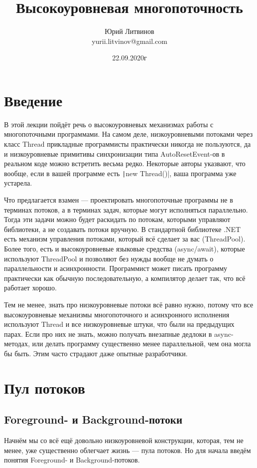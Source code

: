 \documentclass[a5paper]{article}
\title{Высокоуровневая многопоточность}
\author{Юрий Литвинов\\\small{yurii.litvinov@gmail.com}}
\date{22.09.2020г}
\begin{document}
\maketitle
\thispagestyle{empty}

\section{Введение}

В этой лекции пойдёт речь о высокоуровневых механизмах работы с многопоточными программами. На самом деле, низкоуровневыми потоками через класс Thread прикладные программисты практически никогда не пользуются, да и низкоуровневые примитивы синхронизации типа AutoResetEvent-ов в реальном коде можно встретить весьма редко. Некоторые авторы указвают, что вообще, если в вашей программе есть \texttt|new Thread()|, ваша программа уже устарела.

Что предлагается взамен --- проектировать многопоточные программы не в терминах потоков, а в терминах задач, которые могут исполняться параллельно. Тогда эти задачи можно будет раскидать по потокам, которыми управляют библиотеки, а не создавать потоки вручную. В стандартной библиотеке .NET есть механизм управления потоками, который всё сделает за вас (ThreadPool). Более того, есть и высокоуровневые языковые средства (async/await), которые используют ThreadPool и позволяют без нужды вообще не думать о параллельности и асинхронности. Программист может писать программу практически как обычную последовательную, а компилятор делает так, что всё работает хорошо.

Тем не менее, знать про низкоуровневые потоки всё равно нужно, потому что все высокоуровневые механизмы многопоточного и асинхронного исполнения используют Thread и все низкоуровневые штуки, что были на предыдущих парах. Если про них не знать, можно получать внезапные дедлоки в async-методах, или делать программу существенно менее параллельной, чем она могла бы быть. Этим часто страдают даже опытные разработчики.

\section{Пул потоков}

\subsection{Foreground- и Background-потоки}

Начнём мы со всё ещё довольно низкоуровневой конструкции, которая, тем не менее, уже существенно облегчает жизнь --- пула потоков. Но для начала введём понятия Foreground- и Background-потоков.
\end{document}
